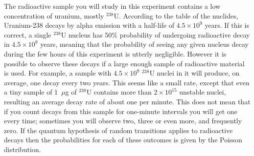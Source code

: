 \documentclass{revtex4}
\begin{document}
The radioactive sample you will study in this experiment contains a low
concentration of uranium, mostly $^{238}$U.  According to the table of
the nuclides, Uranium-238 decays by alpha emission with a half-life of
$4.5\times 10^{9}$ years.  If this is correct, a single $^{238}$U nucleus
has 50\% probability of undergoing radioactive decay in $4.5\times 10^9$
years, meaning that the probability of seeing any given nucleus decay during
the few hours of this experiment is utterly negligible.  However it is
possible to observe these decays if a large enough sample of radioactive
material is used.  For example, a sample with $4.5\times 10^9$ $^{238}$U
nuclei in it will produce, on average, one decay every two years.  This
seems like a small rate, except that even a tiny sample of 1~$\mu$g of
$^{238}$U contains more than $2\times 10^{15}$ unstable nuclei, resulting
an average decay rate of about one per minute.  This does not mean that if
you count decays from this sample for one-minute intervals you will get one
every time; sometimes you will observe two, three or even more, and
frequently zero.  If the quantum hypothesis of random transitions applies
to radioactive decays then the probabilities for each of these outcomes is 
given by the Poisson distribution.
\end{document}
